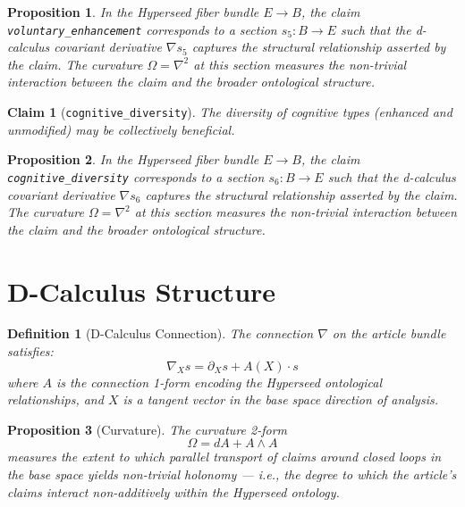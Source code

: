 \documentclass{article}
\newtheorem{claim}{Claim}
\newtheorem{definition}{Definition}
\newtheorem{proposition}{Proposition}
\begin{document}
\begin{proposition}
In the Hyperseed fiber bundle $E \to B$, the claim \texttt{voluntary_enhancement} corresponds to a section $s_5: B \to E$ such that the d-calculus covariant derivative $\nabla s_5$ captures the structural relationship asserted by the claim. The curvature $\Omega = \nabla^2$ at this section measures the non-trivial interaction between the claim and the broader ontological structure.
\end{proposition}

\begin{claim}[\texttt{cognitive_diversity}]
The diversity of cognitive types (enhanced and unmodified) may be collectively beneficial.
\end{claim}

\begin{proposition}
In the Hyperseed fiber bundle $E \to B$, the claim \texttt{cognitive_diversity} corresponds to a section $s_6: B \to E$ such that the d-calculus covariant derivative $\nabla s_6$ captures the structural relationship asserted by the claim. The curvature $\Omega = \nabla^2$ at this section measures the non-trivial interaction between the claim and the broader ontological structure.
\end{proposition}

\section{D-Calculus Structure}

\begin{definition}[D-Calculus Connection]
The connection $\nabla$ on the article bundle satisfies:
\begin{equation}
  \nabla_X s = \partial_X s + A(X) \cdot s
\end{equation}
where $A$ is the connection 1-form encoding the Hyperseed ontological relationships, and $X$ is a tangent vector in the base space direction of analysis.
\end{definition}

\begin{proposition}[Curvature]
The curvature 2-form
\begin{equation}
  \Omega = dA + A \wedge A
\end{equation}
measures the extent to which parallel transport of claims around closed loops in the base space yields non-trivial holonomy --- i.e., the degree to which the article's claims interact non-additively within the Hyperseed ontology.
\end{proposition}
\end{document}
